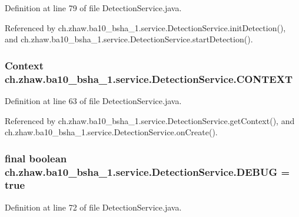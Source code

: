 Definition at line 79 of file DetectionService.java.

Referenced by ch.zhaw.ba10\_\-bsha\_\-1.service.DetectionService.initDetection(), and ch.zhaw.ba10\_\-bsha\_\-1.service.DetectionService.startDetection().\hypertarget{classch_1_1zhaw_1_1ba10__bsha__1_1_1service_1_1DetectionService_a0e249aa466d4da8bcac9f75942129aa6}{
\subsubsection[{CONTEXT}]{\setlength{\rightskip}{0pt plus 5cm}Context {\bf ch.zhaw.ba10\_\-bsha\_\-1.service.DetectionService.CONTEXT}}}
\label{classch_1_1zhaw_1_1ba10__bsha__1_1_1service_1_1DetectionService_a0e249aa466d4da8bcac9f75942129aa6}


Definition at line 63 of file DetectionService.java.

Referenced by ch.zhaw.ba10\_\-bsha\_\-1.service.DetectionService.getContext(), and ch.zhaw.ba10\_\-bsha\_\-1.service.DetectionService.onCreate().\hypertarget{classch_1_1zhaw_1_1ba10__bsha__1_1_1service_1_1DetectionService_a7595c17917add9e9146a3bee444187c9}{
\subsubsection[{DEBUG}]{\setlength{\rightskip}{0pt plus 5cm}final boolean {\bf ch.zhaw.ba10\_\-bsha\_\-1.service.DetectionService.DEBUG} = true}}
\label{classch_1_1zhaw_1_1ba10__bsha__1_1_1service_1_1DetectionService_a7595c17917add9e9146a3bee444187c9}


Definition at line 72 of file DetectionService.java.

